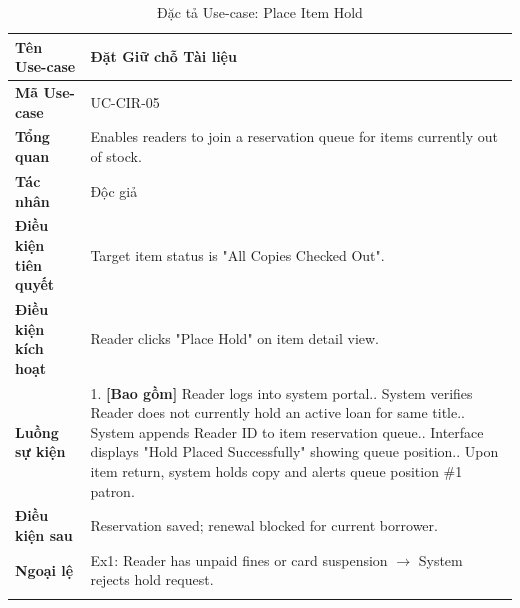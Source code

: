 \begin{longtable}{|p{3.5cm}|p{11.5cm}|}
    \hline
    \textbf{Tên Use-case} & \textbf{Đặt Giữ chỗ Tài liệu} \\
    \hline
    \textbf{Mã Use-case} & UC-CIR-05 \\
    \hline
    \textbf{Tổng quan} & Enables readers to join a reservation queue for items currently out of stock. \\
    \hline
    \textbf{Tác nhân} & Độc giả \\
    \hline
    \textbf{Điều kiện tiên quyết} & Target item status is "All Copies Checked Out". \\
    \hline
    \textbf{Điều kiện kích hoạt} & Reader clicks "Place Hold" on item detail view. \\
    \hline
    \textbf{Luồng sự kiện} & 
    1. \textbf{[Bao gồm]} Reader logs into system portal.\newline
    2. System verifies Reader does not currently hold an active loan for same title.\newline
    3. System appends Reader ID to item reservation queue.\newline
    4. Interface displays "Hold Placed Successfully" showing queue position.\newline
    5. Upon item return, system holds copy and alerts queue position \#1 patron. \\
    \hline
    \textbf{Điều kiện sau} & Reservation saved; renewal blocked for current borrower. \\
    \hline
    \textbf{Ngoại lệ} & 
    Ex1: Reader has unpaid fines or card suspension $\rightarrow$ System rejects hold request. \\
    \hline
    \caption{Đặc tả Use-case: Place Item Hold}
\end{longtable}


